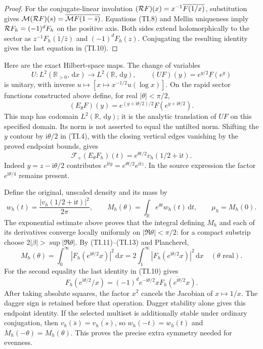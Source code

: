 \documentclass[11pt]{article}
\newcommand{\M}{\mathcal M}
\newcommand{\F}{\mathcal F}
\newcommand{\ii}{\mathrm i}
\newcommand{\dd}{\,\mathrm d}
\begin{document}
\begin{proof}
For the conjugate-linear involution
$({\cal R}F)(x)=x^{-1}\overline{F(1/x)}$, substitution gives
$\M({\cal R}F)(s)=\overline{\M F(1-\bar s)}$. Equations (TI.8) and
Mellin uniqueness imply ${\cal R}F_h=(-1)^dF_h$ on the positive axis.
Both sides extend holomorphically to the sector as
$z^{-1}\overline{F_h(1/\bar z)}$ and $(-1)^dF_h(z)$.
Conjugating the resulting identity gives the last equation in (TI.10).
\end{proof}

Here are the exact Hilbert-space maps. The change of variables
\begin{equation}
 U:L^2(\mathbb R_{>0},\dd x)\longrightarrow L^2(\mathbb R,\dd y),
 \qquad (UF)(y)=e^{y/2}F(e^y) \tag{TI.11}
\end{equation}
is unitary, with inverse $u\mapsto[x\mapsto x^{-1/2}u(\log x)]$.
On the rapid sector functions constructed above define, for real
$|\theta|<\pi/2$,
\begin{equation}
 (E_\theta F)(y)=e^{(y+\ii\theta/2)/2}
 F(e^{y+\ii\theta/2}). \tag{TI.12}
\end{equation}
This map has codomain $L^2(\mathbb R,\dd y)$; it is the analytic
translation of $UF$ on this specified domain. Its norm is not asserted
to equal the untilted norm. Shifting the $y$ contour by $\ii\theta/2$
in (TI.4), with the closing vertical edges vanishing by the proved
endpoint bounds, gives
\begin{equation}
 \F_+(E_\theta F_h)(t)=e^{\theta t/2}v_h(1/2+\ii t). \tag{TI.13}
\end{equation}
Indeed $y=z-\ii\theta/2$ contributes
$e^{\ii ty}=e^{\theta t/2}e^{\ii tz}$. In the source expression
the factor $e^{\ii\theta/4}$ remains present.

Define the original, unscaled density and its mass by
\begin{equation}
 w_h(t)=\frac{|v_h(1/2+\ii t)|^2}{2\pi},\qquad
 M_h(\theta)=\int_{\mathbb R}e^{\theta t}w_h(t)\dd t,
 \qquad \mu_h=M_h(0). \tag{TI.14}
\end{equation}
The exponential estimate above proves that the integral defining
$M_h$ and each of its derivatives converge locally uniformly on
$|\Re\theta|<\pi/2$: for a compact substrip choose
$2|\beta|>\sup|\Re\theta|$. By (TI.11)--(TI.13) and Plancherel,
\begin{equation}
 M_h(\theta)=\int_0^\infty|F_h(e^{\ii\theta/2}x)|^2\dd x
 =2\int_1^\infty|F_h(e^{\ii\theta/2}x)|^2\dd x
 \quad (\theta\text{ real}). \tag{TI.15}
\end{equation}
For the second equality the last identity in (TI.10) gives
\[
 F_h(e^{\ii\theta/2}/x)=(-1)^d e^{-\ii\theta/2}x
 \overline{F_h(e^{\ii\theta/2}x)}.
\]
After taking absolute squares, the factor $x^2$ cancels the Jacobian
of $x\mapsto1/x$. The dagger sign is retained before that operation.
Dagger stability alone gives this endpoint identity. If the selected
multiset is additionally stable under ordinary conjugation, then
$v_h(\bar s)=\overline{v_h(s)}$, so $w_h(-t)=w_h(t)$ and
$M_h(-\theta)=M_h(\theta)$. This proves the precise extra symmetry
needed for evenness.
\end{document}
